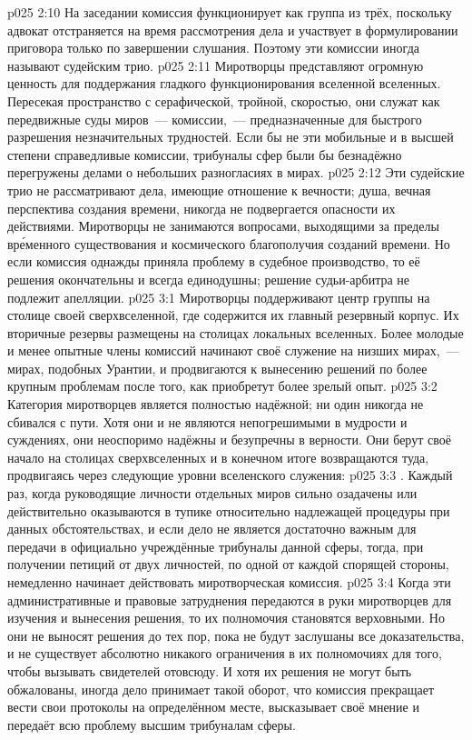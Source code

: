 \vs p025 2:10 \pc На заседании комиссия функционирует как группа из трёх, поскольку адвокат отстраняется на время рассмотрения дела и участвует в формулировании приговора только по завершении слушания. Поэтому эти комиссии иногда называют судейским трио.
\vs p025 2:11 \pc Миротворцы представляют огромную ценность для поддержания гладкого функционирования вселенной вселенных. Пересекая пространство с серафической, тройной, скоростью, они служат как передвижные суды миров~--- комиссии,~--- предназначенные для быстрого разрешения незначительных трудностей. Если бы не эти мобильные и в высшей степени справедливые комиссии, трибуналы сфер были бы безнадёжно перегружены делами о небольших разногласиях в мирах.
\vs p025 2:12 Эти судейские трио не рассматривают дела, имеющие отношение к вечности; душа, вечная перспектива создания времени, никогда не подвергается опасности их действиями. Миротворцы не занимаются вопросами, выходящими за пределы вр\'еменного существования и космического благополучия созданий времени. Но если комиссия однажды приняла проблему в судебное производство, то её решения окончательны и всегда единодушны; решение судьи\hyp{}арбитра не подлежит апелляции.
\vs p025 3:1 Миротворцы поддерживают центр группы на столице своей сверхвселенной, где содержится их главный резервный корпус. Их вторичные резервы размещены на столицах локальных вселенных. Более молодые и менее опытные члены комиссий начинают своё служение на низших мирах,~--- мирах, подобных Урантии, и продвигаются к вынесению решений по более крупным проблемам после того, как приобретут более зрелый опыт.
\vs p025 3:2 Категория миротворцев является полностью надёжной; ни один никогда не сбивался с пути. Хотя они и не являются непогрешимыми в мудрости и суждениях, они неоспоримо надёжны и безупречны в верности. Они берут своё начало на столицах сверхвселенных и в конечном итоге возвращаются туда, продвигаясь через следующие уровни вселенского служения:
\vs p025 3:3 . Каждый раз, когда руководящие личности отдельных миров сильно озадачены или действительно оказываются в тупике относительно надлежащей процедуры при данных обстоятельствах, и если дело не является достаточно важным для передачи в официально учреждённые трибуналы данной сферы, тогда, при получении петиций от двух личностей, по одной от каждой спорящей стороны, немедленно начинает действовать миротворческая комиссия.
\vs p025 3:4 Когда эти административные и правовые затруднения передаются в руки миротворцев для изучения и вынесения решения, то их полномочия становятся верховными. Но они не выносят решения до тех пор, пока не будут заслушаны все доказательства, и не существует абсолютно никакого ограничения в их полномочиях для того, чтобы вызывать свидетелей отовсюду. И хотя их решения не могут быть обжалованы, иногда дело принимает такой оборот, что комиссия прекращает вести свои протоколы на определённом месте, высказывает своё мнение и передаёт всю проблему высшим трибуналам сферы.
